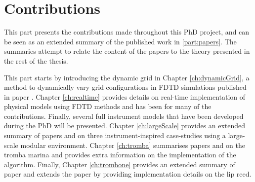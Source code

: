 \chapter*{Contributions}
This part presents the contributions made throughout this PhD project, and can be seen as an extended summary of the published work in \ref{part:papers}. The summaries attempt to relate the content of the papers to the theory presented in the rest of the thesis. 

This part starts by introducing the dynamic grid in Chapter \ref{ch:dynamicGrid}, a method to dynamically vary grid configurations in FDTD simulations published in paper \citeP[G]. Chapter \ref{ch:realtime} provides details on real-time implementation of physical models using FDTD methods and has been for many of the contributions. 
Finally, several full instrument models that have been developed during the PhD will be presented. Chapter \ref{ch:largeScale} provides an extended summary of papers \citeP[A] and \citeP[B] on three instrument-inspired case-studies using a large-scale modular environment. Chapter \ref{ch:tromba} summarises papers \citeP[D] and \citeP[E] on the tromba marina and provides extra information on the implementation of the algorithm. Finally, Chapter \ref{ch:trombone} provides an extended summary of paper \citeP[H] and extends the paper by providing implementation details on the lip reed.